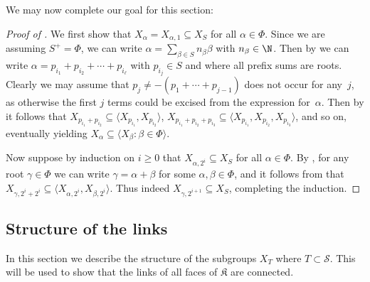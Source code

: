\documentclass[11pt]{article}
\newcommand{\complex}{\mathfrak{K}}
\begin{document}


We may now complete our goal for this section:
\begin{proof}[Proof of ]
We first show that $X_{\alpha} = X_{\alpha,1} \subseteq X_S$ for all $\alpha \in \Phi$.
Since we are assuming $S^+ = \Phi$, we can write $\alpha = \sum_{\beta \in S} n_\beta \beta$ with $n_\beta \in \N$.
Then by  we can write $\alpha = p_{i_1}+p_{i_2}  + \cdots + p_{i_\ell}$ with $p_{i_j} \in S$ and where all prefix sums are roots.
Clearly we may assume that $p_{j} \neq -(p_1 + \cdots + p_{j-1})$ does not occur for any~$j$, as otherwise the first $j$ terms could be excised from the expression for~$\alpha$.
Then by  it follows that $X_{p_{i_1} + p_{i_2}} \subseteq \langle X_{p_{i_1}},X_{p_{i_2}} \rangle$, $X_{p_{i_1}+p_{i_2}+p_{i_3}} \subseteq \langle X_{p_{i_1}},X_{p_{i_2}},X_{p_{i_3}} \rangle$, and so on, eventually yielding $X_\alpha \subseteq \langle X_\beta : \beta \in \Phi \rangle$.

Now suppose by induction on $i \geq 0$ that $X_{\alpha,2^i} \subseteq X_S$ for all $\alpha \in \Phi$. By , for any  root $\gamma \in \Phi$ we can write $\gamma = \alpha + \beta$ for some $\alpha, \beta \in \Phi$, and it follows from  that $X_{\gamma, 2^i+2^i} \subseteq \langle X_{\alpha,2^i},X_{\beta,2^i} \rangle$. Thus indeed $X_{\gamma,2^{i+1}} \subseteq X_S$, completing the induction.
\end{proof}


\subsection{Structure of the links}
In this section we describe the structure of the subgroups $X_T$ where $T \subset \mathcal{S}$. This will be used to show that the links of all faces of $\complex$ are connected.
\end{document}
